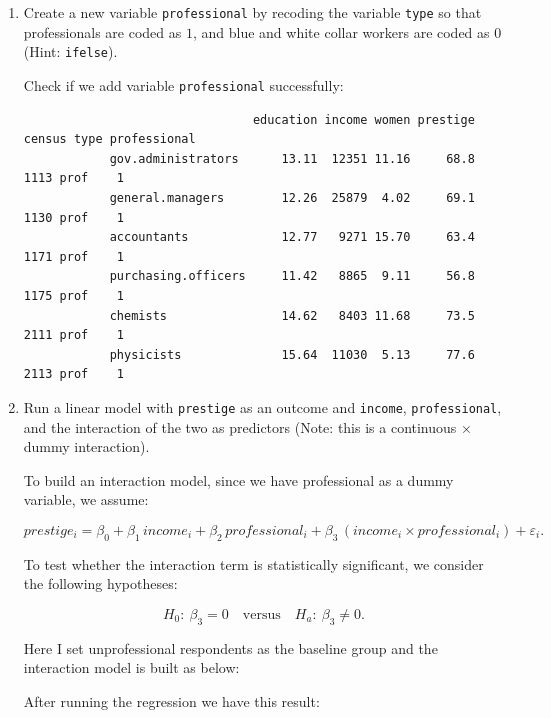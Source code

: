 \documentclass[12pt,letterpaper]{article}
\begin{document}
	\begin{enumerate}
		\item [(a)] Create a new variable \texttt{professional} by recoding the variable \texttt{type} so that professionals are coded as $1$, and blue and white collar workers are coded as $0$ (Hint: \texttt{ifelse}).
		
		\vspace{.3cm}
		
		
		\vspace{.3cm}
		Check if we add variable \texttt{professional} successfully:
		
		\begin{verbatim}
			                    education income women prestige census type professional
			gov.administrators      13.11  12351 11.16     68.8   1113 prof    1
			general.managers        12.26  25879  4.02     69.1   1130 prof    1
			accountants             12.77   9271 15.70     63.4   1171 prof    1
			purchasing.officers     11.42   8865  9.11     56.8   1175 prof    1
			chemists                14.62   8403 11.68     73.5   2111 prof    1
			physicists              15.64  11030  5.13     77.6   2113 prof    1
		\end{verbatim}
		
		\item [(b)] Run a linear model with \texttt{prestige} as an outcome and \texttt{income}, \texttt{professional}, and the interaction of the two as predictors (Note: this is a continuous $\times$ dummy interaction).
		
		\vspace{.3cm}
		To build an interaction model, since we have professional as a dummy variable, we assume:
		
		\[
		prestige_i = \beta_0 + \beta_1\,income_i + \beta_2\,professional_i + \beta_3\,(income_i \times professional_i) + \varepsilon_i.
		\]
		
		To test whether the interaction term is statistically significant, we consider the following hypotheses:
		
		\[
		H_0:\ \beta_3 = 0 \quad \text{versus} \quad H_a:\ \beta_3 \neq 0.
		\]
		
		Here I set unprofessional respondents as the baseline group and the interaction model is built as below:
		
		
		
		After running the regression we have this result:
		

\end{enumerate}
\end{document}
